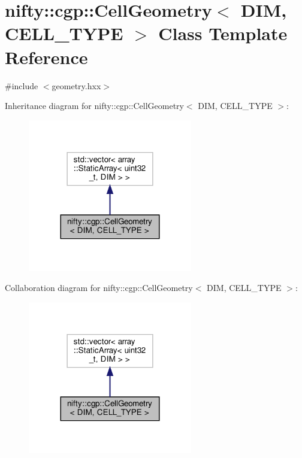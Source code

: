 \hypertarget{classnifty_1_1cgp_1_1CellGeometry}{}\section{nifty\+:\+:cgp\+:\+:Cell\+Geometry$<$ D\+IM, C\+E\+L\+L\+\_\+\+T\+Y\+PE $>$ Class Template Reference}
\label{classnifty_1_1cgp_1_1CellGeometry}


{\ttfamily \#include $<$geometry.\+hxx$>$}



Inheritance diagram for nifty\+:\+:cgp\+:\+:Cell\+Geometry$<$ D\+IM, C\+E\+L\+L\+\_\+\+T\+Y\+PE $>$\+:
\nopagebreak
\begin{figure}[H]
\begin{center}
\leavevmode
\includegraphics[width=203pt]{classnifty_1_1cgp_1_1CellGeometry__inherit__graph}
\end{center}
\end{figure}


Collaboration diagram for nifty\+:\+:cgp\+:\+:Cell\+Geometry$<$ D\+IM, C\+E\+L\+L\+\_\+\+T\+Y\+PE $>$\+:
\nopagebreak
\begin{figure}[H]
\begin{center}
\leavevmode
\includegraphics[width=203pt]{classnifty_1_1cgp_1_1CellGeometry__coll__graph}
\end{center}
\end{figure}
